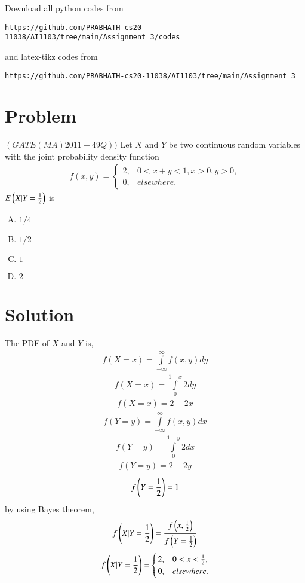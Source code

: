\documentclass[journal,12pt,twocolumn]{IEEEtran}
\begin{document}
Download all python codes from 
\begin{lstlisting}
https://github.com/PRABHATH-cs20-11038/AI1103/tree/main/Assignment_3/codes
\end{lstlisting}

and latex-tikz codes from
\begin{lstlisting}
https://github.com/PRABHATH-cs20-11038/AI1103/tree/main/Assignment_3
\end{lstlisting}

\section{Problem}

$(GATE(MA) 2011-49Q))$ Let $X$ and $Y$ be two continuous random variables with the joint probability density function
\begin{align}
    f(x,y) =
    \begin{cases}
    2, & 0<x+y<1, x>0, y>0,\\
    0, & elsewhere.
    \end{cases}
\end{align}
$E\left(X | Y=\frac{1}{2}\right)$ is
\begin{enumerate}[(A)]
    \item $1/4$
    \item $1/2$
    \item $1$
    \item $2$
\end{enumerate}
\section{Solution}

The PDF of $X$ and $Y$ is,
\begin{align}
    f(X=x)=\int\limits_{-\infty}^\infty f(x,y)d y
\end{align}
\begin{align}
    f(X=x)=\int\limits_0^{1-x}2d y
\end{align}
\begin{align}
    f(X=x)=2-2x
\end{align}
\begin{align}
    f(Y=y)=\int\limits_{-\infty}^\infty f(x,y)d x
\end{align}
\begin{align}
    f(Y=y)=\int\limits_0^{1-y}2d x
\end{align}
\begin{align}
    f(Y=y)=2-2y
\end{align}
\begin{align}
    f\left(Y=\frac{1}{2}\right)=1
\end{align}
by using Bayes theorem,
\begin{align}
    f\left(X | Y=\frac{1}{2}\right)=\frac{f\left(x,\frac{1}{2}\right)}{f\left(Y=\frac{1}{2}\right)}
\end{align}
\begin{align}
    f\left(X|Y=\frac{1}{2}\right)=
    \begin{cases}
    2, & 0<x<\frac{1}{2},\\
    0, & elsewhere.
    \end{cases}
\end{align}
\end{document}
